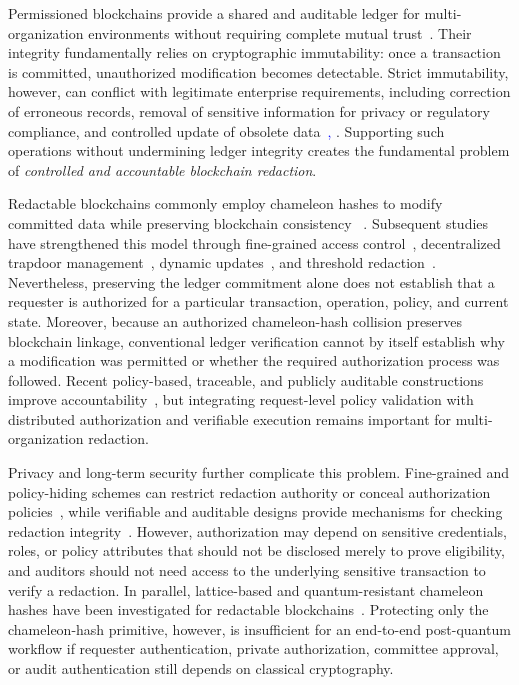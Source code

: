 \documentclass[lettersize,journal]{IEEEtran}
\begin{document}
Permissioned blockchains provide a shared and auditable ledger for
multi-organization environments without requiring complete mutual
trust\textcolor{blue}{~\cite{ref7}}. Their integrity fundamentally relies on cryptographic
immutability: once a transaction is committed, unauthorized
modification becomes detectable. Strict immutability, however, can
conflict with legitimate enterprise requirements, including correction
of erroneous records, removal of sensitive information for privacy or
regulatory compliance, and controlled update of obsolete
data~\cite{ref9,ref21,ref22}\textcolor{blue}{, \cite{ref38}}. Supporting such operations without
undermining ledger integrity creates the fundamental problem of
\emph{controlled and accountable blockchain redaction}.

Redactable blockchains commonly employ chameleon hashes to modify
committed data while preserving blockchain consistency
~\cite{ref1,ref2,ref6,ref30}. Subsequent studies have strengthened this
model through fine-grained access control~\cite{ref8,ref15},
decentralized trapdoor management~\cite{ref3,ref19}, dynamic
updates~\cite{ref5,ref16}, and threshold redaction~\cite{ref27}.
Nevertheless, preserving the ledger commitment alone does not establish
that a requester is authorized for a particular transaction, operation,
policy, and current state. Moreover, because an authorized
chameleon-hash collision preserves blockchain linkage, conventional
ledger verification cannot by itself establish why a modification was
permitted or whether the required authorization process was followed.
Recent policy-based, traceable, and publicly auditable constructions
improve accountability~\cite{ref33,ref34,ref35}, but integrating
request-level policy validation with distributed authorization and
verifiable execution remains important for multi-organization
redaction.

Privacy and long-term security further complicate this problem.
Fine-grained and policy-hiding schemes can restrict redaction authority
or conceal authorization policies~\cite{ref4,ref18,ref31,ref34}, while
verifiable and auditable designs provide mechanisms for checking
redaction integrity~\cite{ref13,ref20,ref33}. However, authorization
may depend on sensitive credentials, roles, or policy attributes that
should not be disclosed merely to prove eligibility, and auditors
should not need access to the underlying sensitive transaction to
verify a redaction. In parallel, lattice-based and quantum-resistant
chameleon hashes have been investigated for redactable
blockchains~\cite{ref10,ref11,ref17,ref37}. Protecting only the
chameleon-hash primitive, however, is insufficient for an end-to-end
post-quantum workflow if requester authentication, private
authorization, committee approval, or audit authentication still
depends on classical cryptography.
\end{document}
